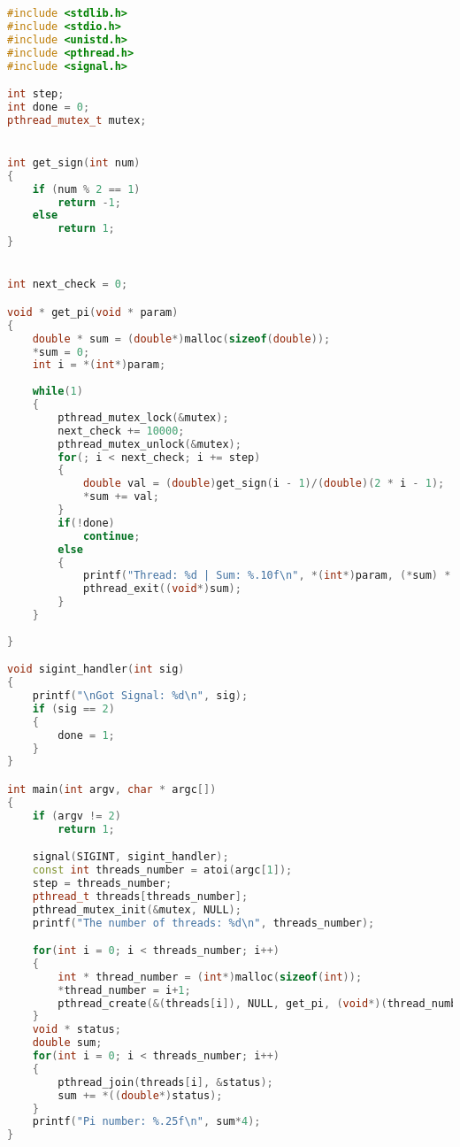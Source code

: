 \documentclass{article}
\begin{document}
\begin{lstlisting}[language=C++]
#include <stdlib.h>
#include <stdio.h>
#include <unistd.h>
#include <pthread.h>
#include <signal.h>

int step;
int done = 0;
pthread_mutex_t mutex;


int get_sign(int num)
{
    if (num % 2 == 1)
        return -1;
    else
        return 1;
}


int next_check = 0;

void * get_pi(void * param)
{
    double * sum = (double*)malloc(sizeof(double));
    *sum = 0;
    int i = *(int*)param;
    
    while(1)
    {
        pthread_mutex_lock(&mutex);
        next_check += 10000;
        pthread_mutex_unlock(&mutex);
        for(; i < next_check; i += step)
        {
            double val = (double)get_sign(i - 1)/(double)(2 * i - 1);
            *sum += val;
        }
        if(!done)
            continue;
        else
        {    
            printf("Thread: %d | Sum: %.10f\n", *(int*)param, (*sum) * 4);
            pthread_exit((void*)sum);
        }   
    }
    
}

void sigint_handler(int sig)
{
    printf("\nGot Signal: %d\n", sig);
    if (sig == 2)
    {
        done = 1;
    }
}

int main(int argv, char * argc[])
{
    if (argv != 2)
        return 1;

    signal(SIGINT, sigint_handler);
    const int threads_number = atoi(argc[1]);
    step = threads_number;
    pthread_t threads[threads_number];
    pthread_mutex_init(&mutex, NULL);
    printf("The number of threads: %d\n", threads_number);

    for(int i = 0; i < threads_number; i++)
    {
        int * thread_number = (int*)malloc(sizeof(int));
        *thread_number = i+1;
        pthread_create(&(threads[i]), NULL, get_pi, (void*)(thread_number));
    }
    void * status;
    double sum;
    for(int i = 0; i < threads_number; i++)
    {
        pthread_join(threads[i], &status);
        sum += *((double*)status);
    }
    printf("Pi number: %.25f\n", sum*4);
}
\end{lstlisting}
\end{document}
